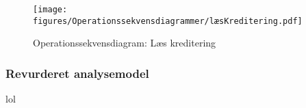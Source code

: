 \begin{figure}[ht] %
\centering
\texttt{[image: figures/Operationssekvensdiagrammer/læsKreditering.pdf]}
\caption{Operationssekvensdiagram: Læs kreditering}
\label{fig:op_read_credit}
\end{figure}

\subsubsection{Revurderet analysemodel}

lol

